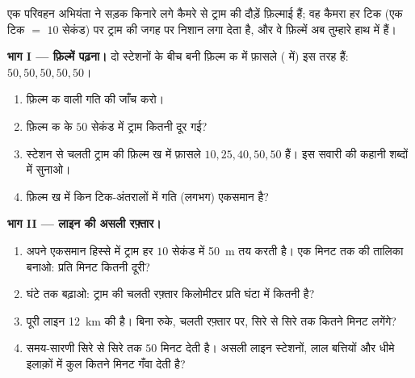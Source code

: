 \begin{problem}\label{pb:g6:describing-motion:1}
एक परिवहन अभियंता ने सड़क किनारे लगे कैमरे से ट्राम की दौड़ें फ़िल्माई
हैं; वह कैमरा हर टिक (एक टिक $=$ $10$ सेकंड) पर ट्राम की जगह पर निशान
लगा देता है, और वे फ़िल्में अब तुम्हारे हाथ में हैं।

\medskip\noindent\textbf{भाग I --- फ़िल्में पढ़ना।}
दो स्टेशनों के बीच बनी फ़िल्म क में फ़ासले ( में) इस तरह हैं:
$50, 50, 50, 50, 50$।
\begin{enumerate}
  \item फ़िल्म क वाली गति की जाँच करो।
  \item फ़िल्म क के $50$ सेकंड में ट्राम कितनी दूर गई?
  \item स्टेशन से चलती ट्राम की फ़िल्म ख में फ़ासले
        $10, 25, 40, 50, 50$ हैं। इस सवारी की कहानी शब्दों में
        सुनाओ।
  \item फ़िल्म ख में किन टिक-अंतरालों में गति (लगभग) एकसमान है?
\end{enumerate}

\medskip\noindent\textbf{भाग II --- लाइन की असली रफ़्तार।}
\begin{enumerate}[resume]
  \item अपने एकसमान हिस्से में ट्राम हर $10$ सेकंड में \qty{50}{m}
        तय करती है। एक मिनट तक की तालिका बनाओ: प्रति मिनट कितनी
        दूरी?
  \item घंटे तक बढ़ाओ: ट्राम की चलती रफ़्तार किलोमीटर प्रति घंटा में
        कितनी है?
  \item पूरी लाइन \qty{12}{km} की है। बिना रुके, चलती रफ़्तार पर,
        सिरे से सिरे तक कितने मिनट लगेंगे?
  \item समय-सारणी सिरे से सिरे तक $50$ मिनट देती है। असली लाइन
        स्टेशनों, लाल बत्तियों और धीमे इलाक़ों में कुल कितने मिनट
        गँवा देती है?
\end{enumerate}


\end{problem}
